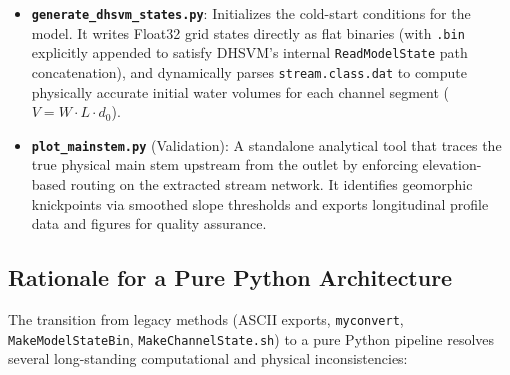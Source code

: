 \documentclass[11pt]{article}
\begin{document}
\begin{itemize}
  \item \textbf{\texttt{generate\_dhsvm\_states.py}}: Initializes the cold-start conditions for the model. It writes Float32 grid states directly as flat binaries (with \texttt{.bin} explicitly appended to satisfy DHSVM's internal \texttt{ReadModelState} path concatenation), and dynamically parses \texttt{stream.class.dat} to compute physically accurate initial water volumes for each channel segment ($V = W \cdot L \cdot d_0$).
  \item \textbf{\texttt{plot\_mainstem.py}} (Validation): A standalone analytical tool that traces the true physical main stem upstream from the outlet by enforcing elevation-based routing on the extracted stream network. It identifies geomorphic knickpoints via smoothed slope thresholds and exports longitudinal profile data and figures for quality assurance.
\end{itemize}

\subsection{Rationale for a Pure Python Architecture}

The transition from legacy methods (ASCII exports, \texttt{myconvert}, \texttt{MakeModelStateBin}, \texttt{MakeChannelState.sh}) to a pure Python pipeline resolves several long-standing computational and physical inconsistencies:
\end{document}

